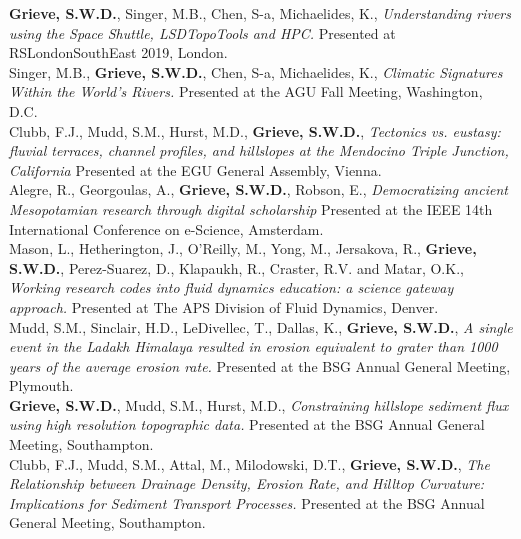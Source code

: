 \documentclass[10pt, a4paper]{article}
\newcommand{\years}[1]{\marginnote{\scriptsize #1}}
\begin{document}
\years{2019}\textbf{Grieve, S.W.D.}, Singer, M.B., Chen, S-a, Michaelides, K., \textit{Understanding rivers using the Space Shuttle, LSDTopoTools and HPC.} Presented at RSLondonSouthEast 2019, London.\\[0.05cm]

\years{2018}Singer, M.B., \textbf{Grieve, S.W.D.}, Chen, S-a, Michaelides, K., \textit{Climatic Signatures Within the World’s Rivers.} Presented at the AGU Fall Meeting, Washington, D.C.\\[0.05cm]

\years{2018}Clubb, F.J., Mudd, S.M., Hurst, M.D., \textbf{Grieve, S.W.D.}, \textit{Tectonics vs. eustasy: fluvial terraces, channel profiles, and hillslopes at the Mendocino Triple Junction, California} Presented at the EGU General Assembly, Vienna.\\[0.05cm]

\years{2018}Alegre, R., Georgoulas, A., \textbf{Grieve, S.W.D.}, Robson, E., \textit{Democratizing ancient Mesopotamian research through digital scholarship} Presented at the IEEE 14th International Conference on e-Science, Amsterdam.\\[0.05cm]

\years{2017}Mason, L., Hetherington, J., O'Reilly, M., Yong, M., Jersakova, R., \textbf{Grieve, S.W.D.}, Perez-Suarez, D., Klapaukh, R., Craster, R.V. and Matar, O.K., \textit{Working research codes into fluid dynamics education: a science gateway approach.} Presented at The APS Division of Fluid Dynamics, Denver.\\[0.05cm]

\years{2016}Mudd, S.M., Sinclair, H.D., LeDivellec, T., Dallas, K., \textbf{Grieve, S.W.D.}, \textit{A single event in the Ladakh Himalaya resulted in erosion equivalent to grater than 1000 years of the average erosion rate.} Presented at the BSG Annual General Meeting, Plymouth.\\[0.05cm]

\years{2015}\textbf{Grieve, S.W.D.}, Mudd, S.M., Hurst, M.D., \textit{Constraining hillslope sediment flux using high resolution topographic data.} Presented at the BSG Annual General Meeting, Southampton.\\[0.05cm]

\years{2015}Clubb, F.J., Mudd, S.M., Attal, M., Milodowski, D.T., \textbf{Grieve, S.W.D.}, \textit{The Relationship between Drainage Density, Erosion Rate, and Hilltop Curvature: Implications for Sediment Transport Processes.} Presented at the BSG Annual General Meeting, Southampton.
\end{document}
